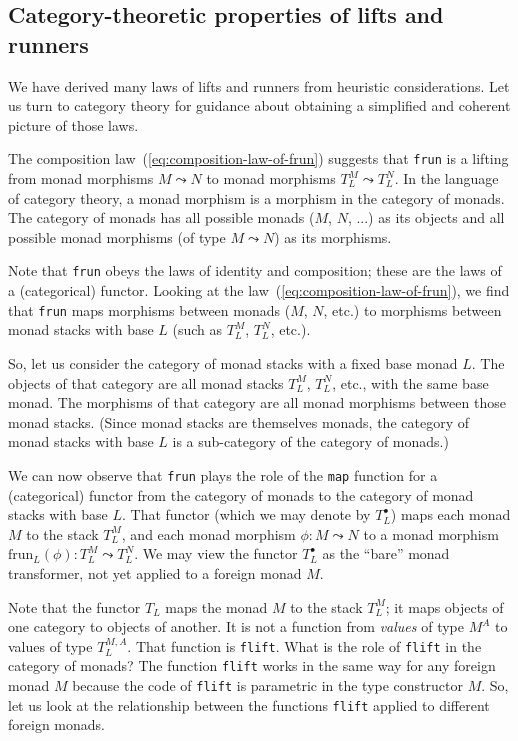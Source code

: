 \subsection{Category-theoretic properties of lifts and runners\label{subsec:Category-theoretic-properties-of-lifts-and-runners-functors-in-category-of-monads}}

We have derived many laws of lifts and runners from heuristic considerations.
Let us turn to category theory for guidance about obtaining a simplified
and coherent picture of those laws.

The composition law~(\ref{eq:composition-law-of-frun}) suggests
that \lstinline!frun! is a lifting from monad morphisms $M\leadsto N$
to monad morphisms $T_{L}^{M}\leadsto T_{L}^{N}$. In the language
of category theory, a monad morphism is a morphism in the category
of monads. The category of monads has all possible monads ($M$, $N$,
...) as its objects and all possible monad morphisms (of type $M\leadsto N$)
as its morphisms. 

Note that \lstinline!frun! obeys the laws of identity and composition;
these are the laws of a (categorical) functor. Looking at the law~(\ref{eq:composition-law-of-frun}),
we find that \lstinline!frun! maps morphisms between monads ($M$,
$N$, etc.) to morphisms between monad stacks with base $L$ (such
as $T_{L}^{M}$, $T_{L}^{N}$, etc.). 

So, let us consider the category of monad stacks with a fixed base
monad $L$. The objects of that category are all monad stacks $T_{L}^{M}$,
$T_{L}^{N}$, etc., with the same base monad. The morphisms of that
category are all monad morphisms between those monad stacks. (Since
monad stacks are themselves monads, the category of monad stacks with
base $L$ is a sub-category of the category of monads.) 

We can now observe that \lstinline!frun! plays the role of the \lstinline!map!
function for a (categorical) functor from the category of monads to
the category of monad stacks with base $L$. That functor (which we
may denote by $T_{L}^{\bullet}$) maps each monad $M$ to the stack
$T_{L}^{M}$, and each monad morphism $\phi:M\leadsto N$ to a monad
morphism $\text{frun}_{L}(\phi):T_{L}^{M}\leadsto T_{L}^{N}$. We
may view the functor $T_{L}^{\bullet}$ as the \textsf{``}bare\textsf{''} monad transformer,
not yet applied to a foreign monad $M$.

Note that the functor $T_{L}$ maps the monad $M$ to the stack $T_{L}^{M}$;
it maps objects of one category to objects of another. It is not a
function from \emph{values} of type $M^{A}$ to values of type $T_{L}^{M,A}$.
That function is \lstinline!flift!. What is the role of \lstinline!flift!
in the category of monads? The function \lstinline!flift! works in
the same way for any foreign monad $M$ because the code of \lstinline!flift!
is parametric in the type constructor $M$. So, let us look at the
relationship between the functions \lstinline!flift! applied to different
foreign monads.

